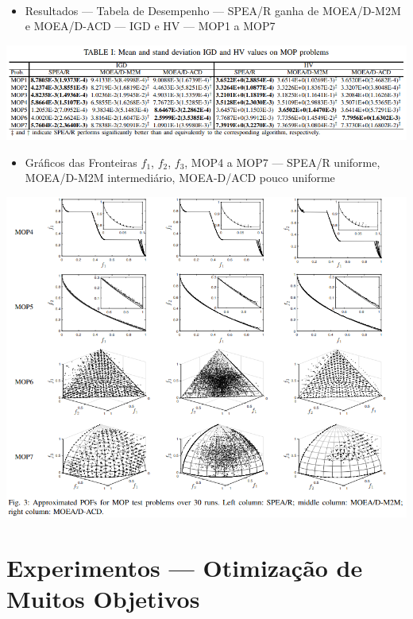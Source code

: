 \documentclass{rbfin}
\begin{document}
\newpage

$\,$

\vspace{60mm}

\begin{itemize}
  \item Resultados --- Tabela de Desempenho --- SPEA/R ganha de MOEA/D-M2M e MOEA/D-ACD --- IGD e HV --- MOP1 a MOP7
\end{itemize}

\begin{center}
\includegraphics[scale=1.2]{table1}
\end{center}

\newpage

\begin{itemize}
  \item Gráficos das Fronteiras $f_1$, $f_2$, $f_3$, MOP4 a MOP7 --- SPEA/R uniforme, MOEA/D-M2M intermediário, MOEA-D/ACD pouco uniforme
\end{itemize}

\begin{center}
\includegraphics[scale=0.9]{fig3}
\end{center}

\newpage
\section{Experimentos --- Otimização de Muitos Objetivos}
\end{document}
